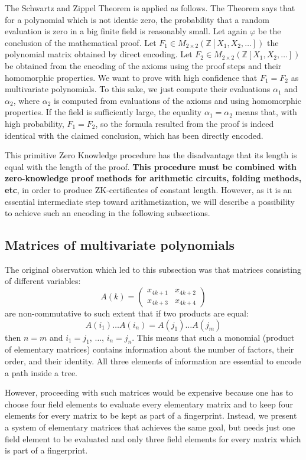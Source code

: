 \documentclass{article}
\theoremstyle{plain}
\theoremstyle{definition}
\begin{document}
The Schwartz and Zippel Theorem is applied as follows. The Theorem says that for a polynomial which is not identic zero, the probability that a random evaluation is zero in a big finite field is reasonably small. Let again $\varphi$ be the conclusion of the mathematical proof. Let $F_1 \in M_{2 \times 2} (\mathbb Z [X_1, X_2, \dots]) $ the polynomial matrix obtained by direct encoding. Let $F_2 \in  M_{2 \times 2} (\mathbb Z [X_1, X_2, \dots])$ be obtained from the encoding of the axioms using the proof steps and their homomorphic properties. We want to prove with high confidence that $F_1 = F_2$ as multivariate polynomials. To this sake, we just compute their evaluations $\alpha_1$ and $\alpha_2$, where $\alpha_2$ is computed from evaluations of the axioms and using homomorphic properties. If the field is sufficiently large, the equality $\alpha_1 = \alpha_2$ means that, with high probability, $F_1 = F_2$, so the formula resulted from the proof is indeed identical with the claimed conclusion, which has been directly encoded.

This primitive Zero Knowledge procedure has the disadvantage that its length is equal with the length of the proof. {\bf This procedure must be combined with zero-knowledge proof methods for arithmetic circuits, folding methods, etc}, in order to produce ZK-certificates of constant length. However, as it is an essential intermediate step toward arithmetization, we will describe a possibility to achieve such an encoding in the following subsections.


\subsection{Matrices of multivariate polynomials}\label{storysimp} 

The original observation which led to this subsection was that matrices consisting of different variables:
$$ A(k) = \begin{pmatrix}
    x_{4k+1} & x_{4k+2} \\ x_{4k+3} & x_{4k+4}
\end{pmatrix}$$
are non-commutative to such extent that if two products are equal: 
$$A(i_1)\dots A(i_n) = A(j_1) \dots A(j_m)$$
then $n = m$ and $i_1 = j_1$, $\dots$, $i_n = j_n$. This means that such a monomial (product of elementary matrices) contains information about the number of factors, their order, and their identity. All three elements of information are essential to encode a path inside a tree.

However, proceeding with such matrices would be expensive because one has to choose four field elements to evaluate every elementary matrix and to keep four elements for every matrix to be kept as part of a fingerprint. Instead, we present a system of elementary matrices that achieves the same goal, but needs just one field element to be evaluated and only three field elements for every matrix which is part of a fingerprint. 
\end{document}
